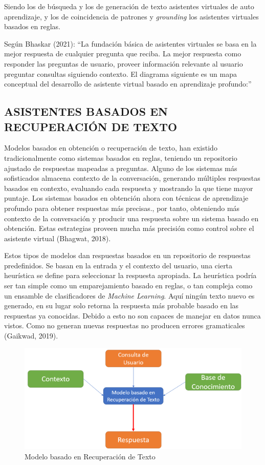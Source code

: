 \documentclass[letter, openright, 12pt]{book}
\begin{document}
Siendo los de búsqueda y los de generación de texto asistentes virtuales de auto aprendizaje, y los de coincidencia de patrones y \textit{grounding } los asistentes virtuales basados en reglas.
\par
Según Bhaskar (2021): “La fundación básica de asistentes virtuales se basa en la mejor respuesta de cualquier pregunta que reciba. La mejor respuesta como responder las preguntas de usuario, proveer información relevante al usuario preguntar consultas siguiendo contexto. El diagrama siguiente es un mapa conceptual del desarrollo de asistente virtual basado en aprendizaje profundo:”

\subsection{ASISTENTES BASADOS EN RECUPERACIÓN DE TEXTO}
Modelos basados en obtención o recuperación de texto, han existido tradicionalmente como sistemas basados en reglas, teniendo un repositorio ajustado de respuestas mapeadas a preguntas. Alguno de los sistemas más sofisticados almacena contexto de la conversación, generando múltiples respuestas basados en contexto, evaluando cada respuesta y mostrando la que tiene mayor puntaje. Los sistemas basados en obtención ahora con técnicas de aprendizaje profundo para obtener respuestas más precisas., por tanto, obteniendo más contexto de la conversación y producir una respuesta sobre un sistema basado en obtención. Estas estrategias proveen mucha más precisión como control sobre el asistente virtual (Bhagwat, 2018).\par
Estos tipos de modelos dan respuestas basados en un repositorio de respuestas predefinidos. Se basan en la entrada y el contexto del usuario, una cierta heurística se define para seleccionar la respuesta apropiada. La heurística podría ser tan simple como un emparejamiento basado en reglas, o tan compleja como un ensamble de clasificadores de \textit{Machine Learning}. Aquí ningún texto nuevo es generado, en su lugar solo retorna la respuesta más probable basado en las respuestas ya conocidas. Debido a esto no son capaces de manejar en datos nunca vistos. Como no generan nuevas respuestas no producen errores gramaticales (Gaikwad, 2019). 

\begin{figure}[!ht]
\includegraphics[width=1\textwidth]{figura2_1}
\caption{Modelo basado en Recuperación de Texto}
\label{tab:figura2_1} 
\end{figure}
\end{document}
